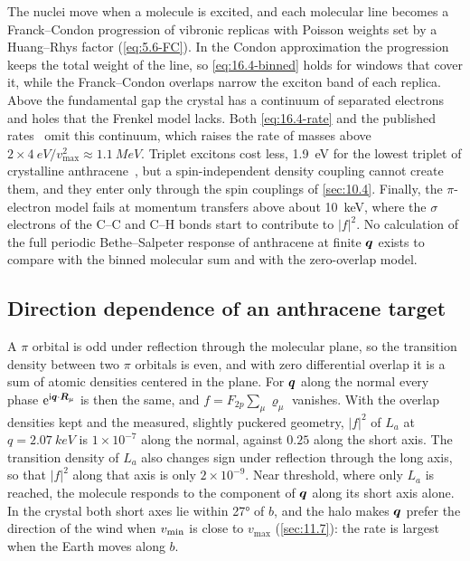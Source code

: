 The nuclei move when a molecule is excited, and each molecular line becomes a Franck--Condon progression of vibronic replicas with Poisson weights set by a Huang--Rhys factor (\cref{eq:5.6-FC}). In the Condon approximation the progression keeps the total weight of the line, so \cref{eq:16.4-binned} holds for windows that cover it, while the Franck--Condon overlaps narrow the exciton band of each replica. Above the fundamental gap the crystal has a continuum of separated electrons and holes that the Frenkel model lacks. Both \cref{eq:16.4-rate} and the published rates~\cite{blanco2020dark} omit this continuum, which raises the rate of masses above $2\times\SI{4}{eV}/v_{\mathrm{max}}^2 \approx \SI{1.1}{MeV}$. Triplet excitons cost less, \SI{1.9}{eV} for the lowest triplet of crystalline anthracene~\cite[Table~III]{rangel2016structural}, but a spin-independent density coupling cannot create them, and they enter only through the spin couplings of \cref{sec:10.4}. Finally, the $\pi$-electron model fails at momentum transfers above about \SI{10}{keV}, where the $\sigma$ electrons of the C--C and C--H bonds start to contribute to $|f|^2$. No calculation of the full periodic Bethe--Salpeter response of anthracene at finite $\bm{q}$ exists to compare with the binned molecular sum and with the zero-overlap model.

\subsection{Direction dependence of an anthracene target}\label{sec:16.4-aniso}

A $\pi$ orbital is odd under reflection through the molecular plane, so the transition density between two $\pi$ orbitals is even, and with zero differential overlap it is a sum of atomic densities centered in the plane. For $\bm{q}$ along the normal every phase $\mathrm{e}^{\mathrm{i}\bm{q}\cdot\bm{R}_\mu}$ is then the same, and $f = F_{2p}\sum_\mu \varrho_\mu$ vanishes. With the overlap densities kept and the measured, slightly puckered geometry, $|f|^2$ of $L_a$ at $q = \SI{2.07}{keV}$ is $1\times10^{-7}$ along the normal, against $0.25$ along the short axis. The transition density of $L_a$ also changes sign under reflection through the long axis, so that $|f|^2$ along that axis is only $2\times10^{-9}$. Near threshold, where only $L_a$ is reached, the molecule responds to the component of $\bm{q}$ along its short axis alone. In the crystal both short axes lie within \ang{27} of $b$, and the halo makes $\bm{q}$ prefer the direction of the wind when $v_{\mathrm{min}}$ is close to $v_{\mathrm{max}}$ (\cref{sec:11.7}): the rate is largest when the Earth moves along $b$.

